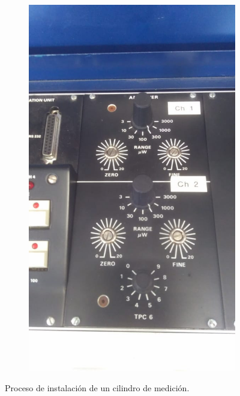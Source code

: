 \begin{figure}[h]
\begin{subfigure}{0.24\linewidth}
			\includegraphics[width=\linewidth]{Figures/process/p4}
			\caption{ }
			\label{fig: subF}
		\end{subfigure}
		\caption{Proceso de instalación de un cilindro de medición.}
		\label{fig: instalationMultiple}
	\end{figure}

